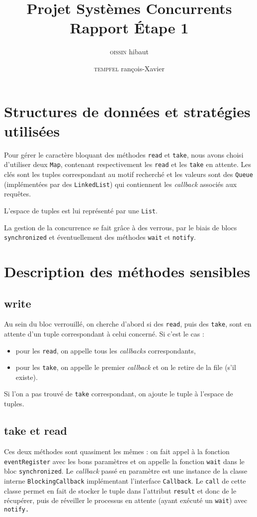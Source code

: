 \documentclass[10pt, a4paper]{article}
\title{\bl{\hrule}\vspace{1em}\Huge\textbf{Projet Systèmes Concurrents \\Rapport Étape 1}\\[-0.7em]\bl{\hrule}}
\author{\Large\textsc{\bl{B}oissin} \bl{T}hibaut \and \textsc{\bl{S}tempfel} \bl{F}rançois-Xavier}
\date{}
\begin{document}
\sffamily


\maketitle



\section*{Structures de données et stratégies utilisées}

Pour gérer le caractère bloquant des méthodes \texttt{read} et \texttt{take}, nous avons choisi d'utiliser deux \texttt{Map}, contenant respectivement les \texttt{read} et les \texttt{take} en attente. Les clés sont les tuples correspondant au motif recherché et les valeurs sont des \texttt{Queue} (implémentées par des \texttt{LinkedList}) qui contiennent les \textit{callback} associés aux requêtes.

L'espace de tuples est lui représenté par une \texttt{List}.

La gestion de la concurrence se fait grâce à des verrous, par le biais de blocs \texttt{synchronized} et éventuellement des méthodes \texttt{wait} et \texttt{notify}.

\section*{Description des méthodes sensibles}

	\subsection*{write}
		Au sein du bloc verrouillé, on cherche d'abord si des \texttt{read}, puis des \texttt{take}, sont en attente d'un tuple correspondant à celui concerné. Si c'est le cas :
		\begin{itemize}
			\item pour les \texttt{read}, on appelle tous les \textit{callbacks} correspondants,
			\item pour les \texttt{take}, on appelle le premier \textit{callback} et on le retire de la file (s'il existe).
		\end{itemize}
		Si l'on a pas trouvé de \texttt{take} correspondant, on ajoute le tuple à l'espace de tuples.
		
	\subsection*{take et read}
		Ces deux méthodes sont quasiment les mêmes : on fait appel à la fonction \texttt{eventRegister} avec les bons paramètres et on appelle la fonction \texttt{wait} dans le bloc \texttt{synchronized}. Le \textit{callback} passé en paramètre est une instance de la classe interne \texttt{BlockingCallback} implémentant l'interface \texttt{Callback}. Le \texttt{call} de cette classe permet en fait de stocker le tuple dans l'attribut \texttt{result} et donc de le récupérer, puis de réveiller le processus en attente (ayant exécuté un \texttt{wait}) avec \texttt{notify.}
		
\end{document}
